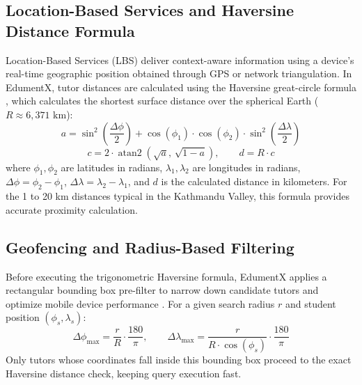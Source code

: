 \documentclass[12pt]{report}
\begin{document}
\subsection{Location-Based Services and Haversine Distance Formula}
Location-Based Services (LBS) deliver context-aware information using a device's real-time geographic position obtained through GPS or network triangulation. In EdumentX, tutor distances are calculated using the Haversine great-circle formula \cite{Sinnott1984Haversine}, which calculates the shortest surface distance over the spherical Earth ($R \approx 6{,}371\text{ km}$):
\begin{equation}
a = \sin^2\!\left(\frac{\Delta\phi}{2}\right) + \cos(\phi_1)\cdot\cos(\phi_2)\cdot\sin^2\!\left(\frac{\Delta\lambda}{2}\right)
\end{equation}
\begin{equation}
c = 2\cdot\operatorname{atan2}\!\left(\sqrt{a},\,\sqrt{1-a}\right), \qquad d = R \cdot c
\end{equation}
where $\phi_1, \phi_2$ are latitudes in radians, $\lambda_1, \lambda_2$ are longitudes in radians, $\Delta\phi = \phi_2 - \phi_1$, $\Delta\lambda = \lambda_2 - \lambda_1$, and $d$ is the calculated distance in kilometers. For the 1 to 20 km distances typical in the Kathmandu Valley, this formula provides accurate proximity calculation.

\subsection{Geofencing and Radius-Based Filtering}
Before executing the trigonometric Haversine formula, EdumentX applies a rectangular bounding box pre-filter to narrow down candidate tutors and optimize mobile device performance \cite{Shevchenko2023Geofencing}. For a given search radius $r$ and student position $(\phi_s, \lambda_s)$:
\begin{equation}
\Delta\phi_{\max} = \frac{r}{R}\cdot\frac{180}{\pi}, \qquad \Delta\lambda_{\max} = \frac{r}{R\cdot\cos(\phi_s)}\cdot\frac{180}{\pi}
\end{equation}
Only tutors whose coordinates fall inside this bounding box proceed to the exact Haversine distance check, keeping query execution fast.
\end{document}
